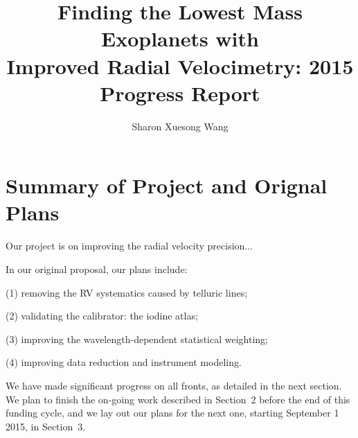 \documentclass[12pt]{article}
\begin{document}

\title{\vspace{-45pt} \bf \Large Finding the Lowest Mass Exoplanets with
  \\ Improved Radial Velocimetry: 2015 Progress Report \vspace{-15pt}}
\author{\normalsize Sharon Xuesong Wang}
\date{}
\maketitle

\vspace{-40pt}
\section{Summary of Project and Orignal Plans}
\vspace{-5pt}

Our project is on improving the radial velocity precision...

In our original proposal, our plans include:

(1) removing the RV systematics caused by telluric lines;

(2) validating the calibrator: the iodine atlas;

(3) improving the wavelength-dependent statistical weighting;

(4) improving data reduction and instrument modeling.

We have made significant progress on all fronts, as detailed in the
next section. We plan to finish the on-going work described in
Section~2 before the end of this funding cycle, and we lay out our
plans for the next one, starting September 1 2015, in Section~3.
\end{document}
